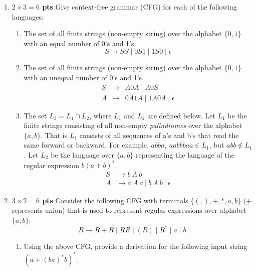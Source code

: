 \documentclass[10pt]{article}
\newcommand {\pts}[1]{{\bf #1 pts}}
\begin{document}
\begin{enumerate}
  \item  \pts{$2\times 3= 6$} Give context-free grammar (CFG) for each of the following languages:
  \begin{enumerate}
           \item The set of all finite strings (non-empty string) over the alphabet $\{0,1\}$ with an equal number of 0's and 1's.
            \[
            S\rightarrow SS \mid 0S1\mid 1S0\mid \epsilon
            \]
           \item The set of all finite strings (non-empty string) over the alphabet $\{0,1\}$ with an unequal number of 0's and 1's.
            \[
            \begin{array}{cll}
            S&\rightarrow& A0A\mid A0S\\
            A&\rightarrow& 0A1A\mid 1A0A\mid \epsilon
            \end{array}
            \]
           \item The set $L_3=L_1\cap L_2$, where $L_1$ and $L_2$ are defined below.
           Let $L_1$ be the finite strings consisting of all non-empty \emph{palindromes} over the alphabet $\{a,b\}$. That is $L_1$
           consists of all sequences of a's and b's that read the same forward or backward. For example, $abba,~aabbbaa\in L_1$, but $abb\not\in L_1$.
           Let $L_2$ be the language over  $\{a,b\}$ representing the language of the regular expression $b(a+b)^\ast$.
            \[
            \begin{array}{cll}
              S    &\rightarrow b\ A\ b \\
              A    &\rightarrow a\ A\ a\ |\ b\ A\ b\ |\ \epsilon
              \end{array}
            \]
  \end{enumerate}
  \item \pts{$3\times 2= 6$} Consider the following CFG with terminals $\{(,),+,*,a,b\}$ ($+$ represents union) that is used to represent
regular expressions over alphabet $\{a, b\}$:
\[R\rightarrow R+R \mid RR\mid (R)\mid R^\ast \mid a\mid b\]
\begin{enumerate}
  \item Using the above CFG, provide a derivation for the following input string $(a+(ba)^\ast b)^\ast$.
            \[
            \begin{array}{cll}

\end{array}\]
\end{enumerate}
\end{enumerate}
\end{document}
